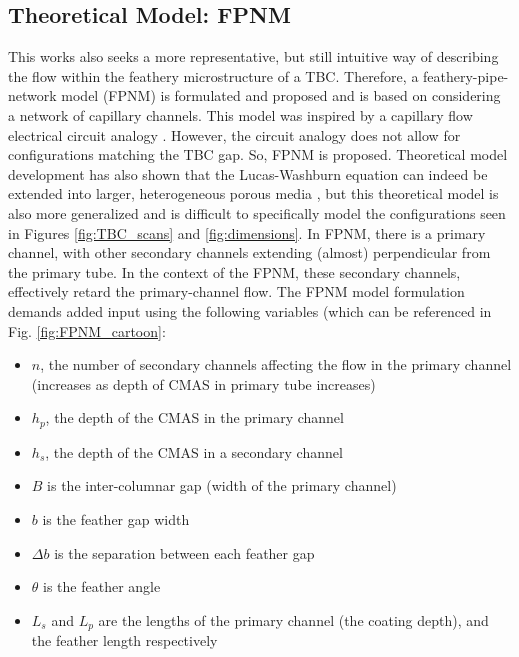 \documentclass{UCF_ETD}
\begin{document}

\subsection{Theoretical Model: FPNM}
\label{sec:pipeNetworkMethod}
This works also seeks a more representative, but still intuitive way of describing the flow within the feathery microstructure of a TBC. Therefore, a feathery-pipe-network model (FPNM)  is formulated and proposed and is based on considering a network of capillary channels. This model was inspired by a capillary flow electrical circuit analogy \cite{Mikaelian2020}. However, the circuit analogy does not allow for configurations matching the TBC gap. So, FPNM is proposed. Theoretical model development has also shown that the Lucas-Washburn equation can indeed be extended into larger, heterogeneous porous media \cite{Cai2021, WAGHMARE2010561}, but this theoretical model is also more generalized and is difficult to specifically model the configurations seen in Figures \ref{fig:TBC_scans} and \ref{fig:dimensions}.
In FPNM, there is a primary channel, with other secondary channels extending (almost) perpendicular from the primary tube. In the context of the FPNM, these secondary channels, effectively retard the primary-channel flow. The FPNM model formulation demands added input using the following variables (which can be referenced in Fig. \ref{fig:FPNM_cartoon}:

\begin{itemize}
    \item $n$, the number of secondary channels affecting the flow in the primary channel (increases as depth of CMAS in primary tube increases)
    \item $h_{p}$, the depth of the CMAS in the primary channel
    \item $h_{s}$, the depth of the CMAS in a secondary channel
    \item $B$ is the inter-columnar gap (width of the primary channel)
    \item $b$ is the feather gap width
    \item $\Delta b$ is the separation between each feather gap
    \item $\theta$ is the feather angle
    \item $L_{s}$ and $L_{p}$ are the lengths of the primary channel (the coating depth), and the feather length respectively
\end{itemize}
\end{document}

